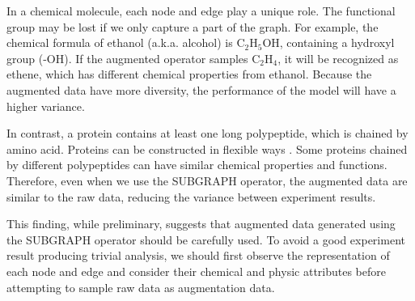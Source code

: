 In a chemical molecule, each node and edge play a unique role. The functional group may be lost if we only capture a part of the graph. For example, the chemical formula of ethanol (a.k.a. alcohol) is $\text{C}_{2}\text{H}_{5}\text{OH}$, containing a hydroxyl group (-OH). If the augmented operator samples $\text{C}_{2}\text{H}_{4}$, it will be recognized as ethene, which has different chemical properties from ethanol. Because the augmented data have more diversity, the performance of the model will have a higher variance.

In contrast, a protein contains at least one long polypeptide, which is chained by amino acid. Proteins can be constructed in flexible ways \cite{accurateprotein}. Some proteins chained by different polypeptides can have similar chemical properties and functions. Therefore, even when we use the SUBGRAPH operator, the augmented data are similar to the raw data, reducing the variance between experiment results.

This finding, while preliminary, suggests that augmented data generated using the SUBGRAPH operator should be carefully used. To avoid a good experiment result producing trivial analysis, we should first observe the representation of each node and edge and consider their chemical and physic attributes before attempting to sample raw data as augmentation data.

